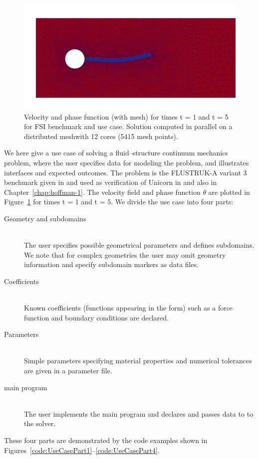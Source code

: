 \begin{figure}
  \includegraphics[width=\largefig]{chapters/hoffman-2/png/fsi3_theta_250.png}
  \caption{Velocity and phase function (with mesh) for times t = 1 and t = 5 for FSI benchmark and use case. Solution computed in parallel on a distributed meshwith 12 cores (5415 mesh points).}
  \label{fig:fsi2D_plot2}
\end{figure}

We here give a use case of solving a fluid--structure continuum
mechanics problem, where the user specifies data for modeling the
problem, and illustrates interfaces and expected outcomes. The problem
is the FLUSTRUK-A variant 3 benchmark given in \citep{HronTurek2005}
and used as verification of Unicorn
in \citep{HoffmanJanssonStockli2011} and also in
Chapter~\ref{chap:hoffman-1}. The velocity field and phase function
$\theta$ are plotted in Figure~\ref{fig:fsi2D_plot2} for times t = 1
and t = 5. We divide the use case into four parts:

\begin{description}
\item[Geometry and subdomains] \ \\ The user specifies possible
  geometrical parameters and defines subdomains. We note that for
  complex geometries the user may omit geometry information and
  specify subdomain markers as data files.
\item[Coefficients] \ \\ Known coefficients (functions appearing in the form)
  such as a force function and boundary conditions are declared.
\item[Parameters] \ \\ Simple parameters specifying material properties and numerical tolerances are given
in a parameter file.
\item[main program] \ \\ The user implements the main program and
  declares and passes data to to the solver.
\end{description}
These four parts are demonstrated by the code examples shown in
Figures~\ref{code:UseCasePart1}--\ref{code:UseCasePart4}.

